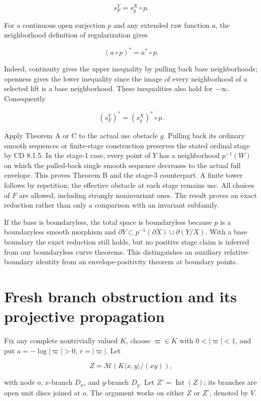 \documentclass[
  11pt,
]{article}
\begin{document}
\[
s_F^Y=s_g^X\circ p.
\]

For a continuous open surjection \(p\) and any extended raw function
\(a\), the neighborhood definition of regularization gives

\[
(a\circ p)^*=a^*\circ p.
\]

Indeed, continuity gives the upper inequality by pulling back base
neighborhoods; openness gives the lower inequality since the image of
every neighborhood of a selected lift is a base neighborhood. These
inequalities also hold for \(-\infty\). Consequently

\[
(s_F^Y)^*=(s_g^X)^*\circ p.
\]

Apply Theorem A or C to the actual usc obstacle \(g\). Pulling back its
ordinary smooth sequences or finite-stage construction preserves the
stated ordinal stage by CD 8.1.5. In the stage-1 case, every point of
\(Y\) has a neighborhood \(p^{-1}(W)\) on which the pulled-back single
smooth sequence decreases to the actual full envelope. This proves
Theorem B and the stage-3 counterpart. A finite tower follows by
repetition; the effective obstacle at each stage remains usc. All
choices of \(F\) are allowed, including strongly noninvariant ones. The
result proves an exact reduction rather than only a comparison with an
invariant subfamily.

If the base is boundaryless, the total space is boundaryless because
\(p\) is a boundaryless smooth morphism and
\(\partial Y\subset p^{-1}(\partial X)\cup\partial(Y/X)\). With a base
boundary the exact reduction still holds, but no positive stage claim is
inferred from our boundaryless curve theorems. This distinguishes an
auxiliary relative-boundary identity from an envelope-positivity theorem
at boundary points.

\section{Fresh branch obstruction and its projective
propagation}\label{fresh-branch-obstruction-and-its-projective-propagation}

Fix any complete nontrivially valued \(K\), choose \(\varpi\in K\) with
\(0<|\varpi|<1\), and put \(a=-\log|\varpi|>0\), \(r=|\varpi|\). Let

\[
Z=\mathcal M(K\langle x,y\rangle/(xy)),
\]

with node \(o\), \(x\)-branch \(D_x\), and \(y\)-branch \(D_y\). Let
\(Z^\circ=\operatorname{Int}(Z)\); its branches are open unit discs
joined at \(o\). The argument works on either \(Z\) or \(Z^\circ\),
denoted by \(V\).
\end{document}
